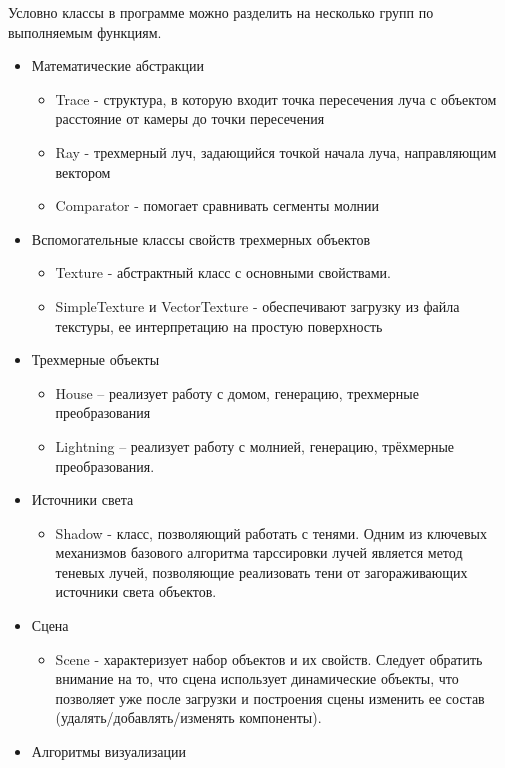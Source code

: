 Условно классы в программе можно разделить на несколько групп по выполняемым функциям.

\begin{itemize}
	\item Математические абстракции
	\begin{itemize}
		\item Trace - структура, в которую входит точка пересечения луча с объектом расстояние от камеры до точки пересечения
		\item Ray - трехмерный луч, задающийся точкой начала луча, направляющим вектором
		\item Comparator - помогает сравнивать сегменты молнии
	\end{itemize}
	\item Вспомогательные классы свойств трехмерных объектов
	\begin{itemize}
		\item Texture - абстрактный класс с основными свойствами.
		\item SimpleTexture и VectorTexture - обеспечивают загрузку из файла текстуры, ее интерпретацию на простую поверхность
	\end{itemize}
	\item Трехмерные объекты
	\begin{itemize}
		\item House – реализует работу с домом, генерацию, трехмерные преобразования
		\item Lightning – реализует работу с молнией, генерацию, трёхмерные преобразования.
	\end{itemize}
	\item Источники света
	\begin{itemize}
		\item Shadow - класс, позволяющий работать с тенями. Одним из ключевых механизмов базового алгоритма тарссировки лучей является метод теневых лучей, позволяющие реализовать тени от загораживающих источники света объектов.
	\end{itemize}
	\item Сцена
	\begin{itemize}
		\item Scene - характеризует набор объектов и их свойств. Следует обратить внимание на то, что сцена использует динамические объекты, что позволяет уже после загрузки и построения сцены изменить ее состав (удалять/добавлять/изменять компоненты).
	\end{itemize}
	\item Алгоритмы визуализации

\end{itemize}
